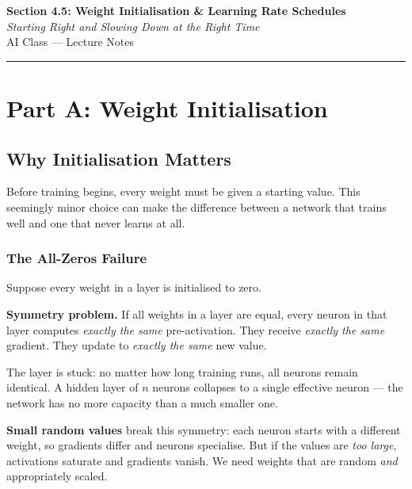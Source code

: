 \documentclass[12pt, a4paper]{article}
\newif\ifstudentmode
\theoremstyle{definition}
\begin{document}
\begin{center}
  {\LARGE \textbf{Section 4.5: Weight Initialisation \& Learning Rate Schedules}} \\[0.3em]
  {\large\itshape Starting Right and Slowing Down at the Right Time} \\[0.5em]
  {\large AI Class --- Lecture Notes}%
  \ifstudentmode\quad{\normalsize\color{gray}[Student Copy]}\fi
\end{center}

\vspace{1em}\hrule\vspace{1.5em}

\section{Part A: Weight Initialisation}

\subsection{Why Initialisation Matters}

Before training begins, every weight must be given a starting value.
This seemingly minor choice can make the difference between a network
that trains well and one that never learns at all.

\subsubsection*{The All-Zeros Failure}

Suppose every weight in a layer is initialised to zero.

\begin{warnbox}
\textbf{Symmetry problem.}
If all weights in a layer are equal, every neuron in that layer computes
\emph{exactly the same} pre-activation.
They receive \emph{exactly the same} gradient.
They update to \emph{exactly the same} new value.

The layer is stuck: no matter how long training runs, all neurons remain
identical.  A hidden layer of $n$ neurons collapses to a single effective
neuron --- the network has no more capacity than a much smaller one.
\end{warnbox}

\textbf{Small random values} break this symmetry: each neuron starts with
a different weight, so gradients differ and neurons specialise.
But if the values are \emph{too large}, activations saturate and gradients
vanish.  We need weights that are random \emph{and} appropriately scaled.
\end{document}
